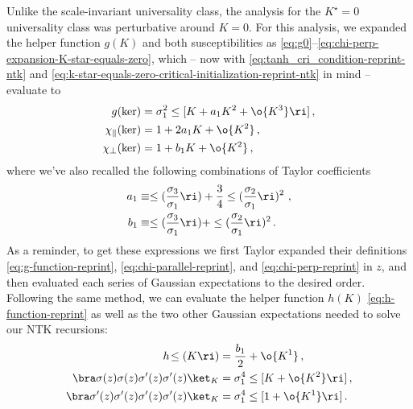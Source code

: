 Unlike the scale-invariant universality class, the  analysis for the $K^\star=0$ universality class was perturbative around $K=0$.
For this analysis, we expanded the helper function $g(K)$ and both susceptibilities as \eqref{eq:g0}--\eqref{eq:chi-perp-expansion-K-star-equals-zero}, which 
-- now with \eqref{eq:tanh_cri_condition-reprint-ntk} and \eqref{eq:k-star-equals-zero-critical-initialization-reprint-ntk} in mind --
evaluate to
\begin{align}\label{eq:g0-reprint-ntk}
g(\ker)&=\sigma_1^2\le[ K+a_1 K^2+\o{K^3}\ri]\, , \\
\label{eq:chi-para-reprint-ntk-kstar}
\chi_{\parallel}(\ker)&=1+2 a_1K+\o{K^2}\, ,\\
\label{eq:chi-perp-reprint-ntk-kstar}
\chi_{\perp}(\ker)&=1+b_1 K+\o{K^2}\, ,
\end{align}
where we've also recalled the following combinations of Taylor coefficients
\begin{align}
a_1&\equiv \le(\frac{\sigma_3}{\sigma_1}\ri)+\frac{3}{4}\le(\frac{\sigma_2}{\sigma_1}\ri)^2\ ,\\
b_1&\equiv \le(\frac{\sigma_3}{\sigma_1}\ri)+\le(\frac{\sigma_2}{\sigma_1}\ri)^2\, .%
\end{align}
As a reminder, to get these expressions we first Taylor expanded their definitions \eqref{eq:g-function-reprint},  \eqref{eq:chi-parallel-reprint}, and \eqref{eq:chi-perp-reprint} in $z$,
and then evaluated each series of Gaussian expectations to the desired order. 
Following the same method, we can evaluate the helper function $h(K)$ \eqref{eq:h-function-reprint} as well as the two other Gaussian expectations needed to solve our NTK recursions:
\begin{align}
\label{eq:k-star-h-ntk}
h\!\le(K\ri)&=\frac{b_1}{2}+\o{K^1}\, ,\\
\label{eq:gaussian-expectation-ntk-k-star-2}
\bra \sigma(z)\sigma(z)\sigma'(z)\sigma'(z) \ket_{K}&=\sigma_1^4 \le[K+\o{K^2} \ri]  \, ,\\
\label{eq:gaussian-expectation-k-star-3}
\bra \sigma'(z)\sigma'(z)\sigma'(z)\sigma'(z) \ket_{K}&=  \sigma_1^4 \le[1+\o{K^1} \ri]\, .
\end{align}

